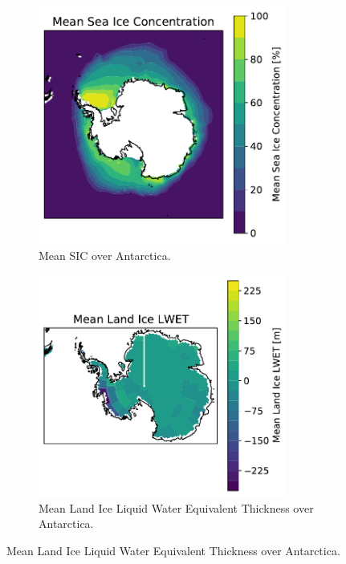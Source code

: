 \documentclass[../main.tex]{subfiles}
\begin{document}
\begin{figure}[h!]
\centering
\begin{subfigure}[h!]{0.49\textwidth}
\includegraphics[width=0.9\textwidth]{images/week8/hres/mean_sic_distribution}
\caption{Mean SIC over Antarctica.}
\end{subfigure}
\begin{subfigure}[h!]{0.49\textwidth}
\includegraphics[width=0.9\textwidth]{images/week8/hres/mean_lic_distribution}
\caption{Mean Land Ice Liquid Water Equivalent Thickness over Antarctica.}

\end{subfigure}
\end{figure}
\end{document}
